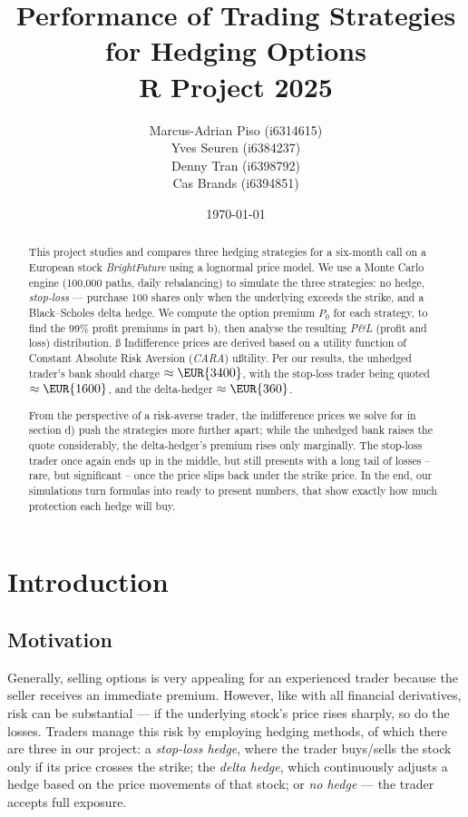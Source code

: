 \documentclass[11pt,a4paper]{article}
\title{Performance of Trading Strategies for Hedging Options\\[0.5em]\large R Project 2025}
\author{Marcus-Adrian Piso (i6314615) \\ Yves Seuren (i6384237)\\ Denny Tran (i6398792)\\ Cas Brands (i6394851)}
\date{\today}
\begin{document}
	\maketitle
	
	\begin{abstract}
		This project studies and compares three hedging strategies for a six-month call on a European stock \textit{BrightFuture} using a lognormal price model. 
		We use a Monte Carlo engine (100{,}000 paths, daily rebalancing) to simulate the three strategies: no hedge, \textit{stop-loss} --- purchase 100 shares only when the underlying exceeds the strike, and a Black--Scholes delta hedge. 
		We compute the option premium \( P_0 \) for each strategy, to find the 99\% profit premiums in part b), then analyse the resulting \textit{P\&L} (profit and loss) distribution. ß
		Indifference prices are derived based on a utility function of Constant Absolute Risk Aversion (\textit{CARA}) ußtility. 
		Per our results, the unhedged trader's bank should charge \( \approx \EUR{3400} \), with the stop-loss trader being quoted \( \approx \EUR{1600} \), and the delta-hedger \( \approx \EUR{360} \).
		
		From the perspective of a risk-averse trader, the indifference prices we solve for in section d) push the strategies more further apart; while the unhedged bank raises the quote considerably, the delta-hedger’s premium rises only marginally. 
		The stop-loss trader once again ends up in the middle, but still presents with a long tail of losses – rare, but significant – once the price slips back under the strike price. 
		In the end, our simulations turn formulas into ready to present numbers, that show exactly how much protection each hedge will buy.
	\end{abstract}
	
	\tableofcontents
	\newpage
	\section{Introduction}
	\subsection{Motivation}
	Generally, selling options is very appealing for an experienced trader because the seller receives an immediate premium. However, like with all financial derivatives, risk can be substantial --- if the underlying stock’s price rises sharply, so do the losses. Traders manage this risk by employing hedging methods, of which there are three in our project: a \textit{stop-loss hedge}, where the trader buys/sells the stock only if its price crosses the strike; the \textit{delta hedge}, which continuously adjusts a hedge based on the price movements of that stock; or \textit{no hedge} --- the trader accepts full exposure.
	
\end{document}
